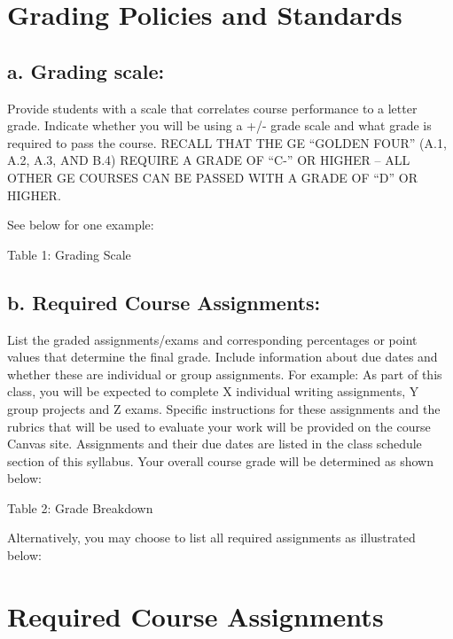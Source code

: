 \documentclass[12pt]{article}
\begin{document}
\section{Grading Policies and Standards}

\subsection*{a. Grading scale:} 
{\color{annotationblue}Provide students with a scale that correlates course performance to a letter grade. Indicate whether you will be using a +/- grade scale and what grade is required to pass the course. RECALL THAT THE GE ``GOLDEN FOUR'' (A.1, A.2, A.3, AND B.4) REQUIRE A GRADE OF ``C-'' OR HIGHER -- ALL OTHER GE COURSES CAN BE PASSED WITH A GRADE OF ``D'' OR HIGHER.}

{\color{suggestionred}See below for one example:}

\begin{center}
Table 1: Grading Scale
\end{center}


\subsection*{b. Required Course Assignments:}
{\color{annotationblue}List the graded assignments/exams and corresponding percentages or point values that determine the final grade. Include information about due dates and whether these are individual or group assignments.} {\color{suggestionred}For example: As part of this class, you will be expected to complete X individual writing assignments, Y group projects and Z exams. Specific instructions for these assignments and the rubrics that will be used to evaluate your work will be provided on the course Canvas site. Assignments and their due dates are listed in the class schedule section of this syllabus. Your overall course grade will be determined as shown below:}

\begin{center}
Table 2: Grade Breakdown
\end{center}

{\color{annotationblue}Alternatively, you may choose to list all required assignments as illustrated below:}

\section{Required Course Assignments}
\end{document}
